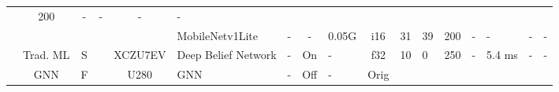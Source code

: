 \begin{table}
\begin{adjustbox}{totalheight=\baselineskip,}
\begin{tabular}{ccccclp{2em}cp{3em}cp{2em}p{4em}p{3em}p{3.5em}p{3.5em}p{2.5em}p{3em}}
                                               &\multirow{1}{*}{200}
                                                   &\multirow{1}{*}{-}
                                                       &\multirow{1}{*}{-}
                                                           &\multirow{1}{*}{-}
                                                               &\multirow{1}{*}{-}\\
   &   &   &   &   &\multirow{1}{*}{MobileNetv1Lite}
                       &\multirow{1}{*}{-}
                           &\multirow{1}{*}{-}
                               &\multirow{1}{*}{0.05G}
                                   &\multirow{1}{*}{i16}
                                       &\multirow{1}{*}{31}
                                           &\multirow{1}{*}{39}
                                               &\multirow{1}{*}{200}
                                                   &\multirow{1}{*}{-}
                                                       &\multirow{1}{*}{-}
                                                           &\multirow{1}{*}{-}
                                                               &\multirow{1}{*}{-}\\
\cmidrule{2-17}
   &\multirow{1}{*}{Trad. ML}
       &\multirow{1}{*}{S}
           &\multirow{1}{*}{\cite{boyleHighlevelFPGADesign2023a}}
               &\multirow{1}{*}{XCZU7EV}
                   &\multirow{1}{*}{Deep Belief Network}
                       &\multirow{1}{*}{-}
                           &\multirow{1}{*}{On}
                               &\multirow{1}{*}{-}
                                   &\multirow{1}{*}{f32}
                                       &\multirow{1}{*}{10}
                                           &\multirow{1}{*}{0}
                                               &\multirow{1}{*}{250}
                                                   &\multirow{1}{*}{-}
                                                       &\multirow{1}{*}{5.4 ms}
                                                           &\multirow{1}{*}{-}
                                                               &\multirow{1}{*}{-}\\
\cmidrule{2-17}
   &\multirow{2}{*}{GNN}
       &\multirow{2}{*}{F}
           &\multirow{1}{*}{\cite{zhangAcceleratingGNNbasedSAR2023}}
               &\multirow{1}{*}{U280}
                   &\multirow{1}{*}{GNN}
                       &\multirow{1}{*}{-}
                           &\multirow{1}{*}{Off}
                               &\multirow{1}{*}{-}
                                   &\multirow{1}{*}{Orig}

\end{tabular}
\end{adjustbox}
\end{table}
